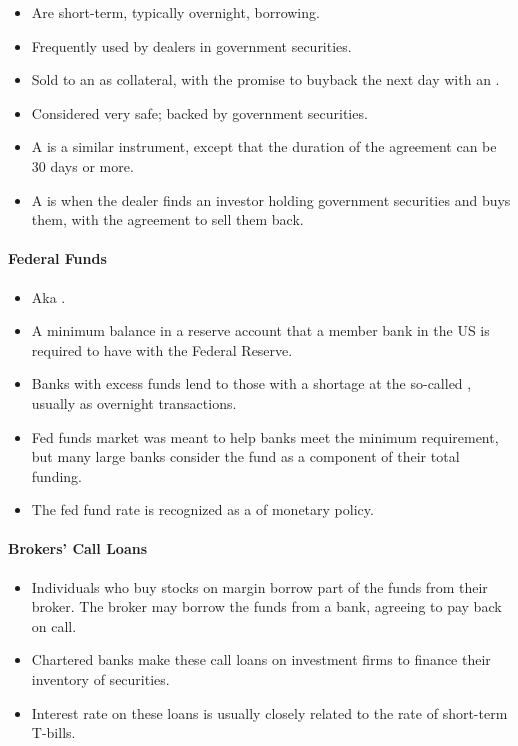 \documentclass[notoc,notitlepage]{tufte-book}
\begin{document}
\begin{itemize}
  \item Are short-term, typically overnight, borrowing.
  \item Frequently used by dealers in government securities.
  \item Sold to an  as collateral,
    with the promise to buyback the next day
    with an .
  \item Considered very safe; backed by government securities.
  \item A  is a similar instrument,
    except that the duration of the agreement can be 30 days or more.
  \item A  is when
    the dealer finds an investor holding government securities and buys them,
    with the agreement to sell them back.
\end{itemize}

\paragraph{Federal Funds}\label{para:federal_funds}

\begin{itemize}
  \item Aka .
  \item A minimum balance in a reserve account that a member bank in the US
    is required to have with the Federal Reserve.
  \item Banks with excess funds lend to those with a shortage at the
    so-called , usually as overnight transactions.
  \item Fed funds market was meant to help banks meet the minimum requirement,
    but many large banks consider the fund as a component of their total
    funding.
  \item The fed fund rate is recognized as a  of monetary
    policy.
\end{itemize}

\paragraph{Brokers' Call Loans}\label{para:brokers_call_loans}

\begin{itemize}
  \item Individuals who buy stocks on margin
    borrow part of the funds from their broker.
    The broker may borrow the funds from a bank,
    agreeing to pay back on call.
  \item Chartered banks make these call loans on investment firms
    to finance their inventory of securities.
  \item Interest rate on these loans is usually closely related to
    the rate of short-term T-bills.
\end{itemize}
\end{document}
